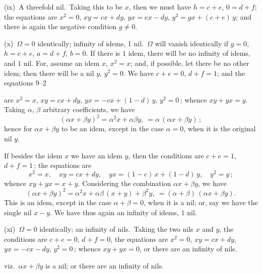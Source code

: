 \documentclass[11pt,a4paper]{article}
\providecommand{\textsc}[1]{{\scshape #1}}
\begin{document}
\medskip
(ix)\ A threefold nil.\ Taking this to be $x$, then we must have $h = c + e$, $0 = d + f$; the equations are $x^{2} = 0$, $xy = cx + dy$, $yx = ex - dy$, $y^{2} = gx + (c + e)\,y$; and there is again the negative condition $g \neq 0$.

\medskip
(x)\ $\Omega = 0$ identically; infinity of idems, 1 nil.\ $\Omega$ will vanish identically if $g = 0$, $h = c + e$, $a = d + f$, $b = 0$.  If there is $1$ idem, there will be no infinity of idems, and $1$ nil.  For, assume an idem $x$, $x^{2} = x$; and, if possible, let there be no other idem; then there will be a nil $y$, $y^{2} = 0$.  We have $c + e = 0$, $d + f = 1$; and the equations
\vfill
\noindent\hfill 9--2
\clearpage

\fancyhead[C]{\small\textsc{on double algebra.}}
\fancyhead[R]{\small [814}

\thispagestyle{plain}
\noindent are $x^{2} = x$, $xy = cx + dy$, $yx = -cx + (1 - d)\,y$, $y^{2} = 0$\,; whence $xy + yx = y$.  Taking $\alpha$, $\beta$ arbitrary coefficients, we have
\[
(\alpha x + \beta y)^{2} = \alpha^{2}x + \alpha\beta y,\ = \alpha\,(\alpha x + \beta y)\,;
\]
hence for $\alpha x + \beta y$ to be an idem, except in the case $\alpha = 0$, when it is the original nil $y$.

\medskip
If besides the idem $x$ we have an idem $y$, then the conditions are $c + e = 1$, $d + f = 1$\,; the equations are
\[
x^{2} = x,\quad xy = cx + dy,\quad yx = (1 - c)\,x + (1 - d)\,y,\quad y^{2} = y\,;
\]
whence $xy + yx = x + y$.  Considering the combination $\alpha x + \beta y$, we have
\[
(\alpha x + \beta y)^{2} = \alpha^{2}x + \alpha\beta\,(x + y) + \beta^{2}y,\ = (\alpha + \beta)\,(\alpha x + \beta y).
\]
This is an idem, except in the case $\alpha + \beta = 0$, when it is a nil; or, say we have the single nil $x - y$.  We have thus again an infinity of idems, $1$ nil.

\medskip
(xi)\ $\Omega = 0$ identically; an infinity of nils.\ Taking the two nils $x$ and $y$, the conditions are $c + e = 0$, $d + f = 0$, the equations are $x^{2} = 0$, $xy = cx + dy$, $yx = -cx - dy$, $y^{2} = 0$\,; whence $xy + yx = 0$, or there are an infinity of nils.

\medskip
viz.\ $\alpha x + \beta y$ is a nil; or there are an infinity of nils.
\end{document}
